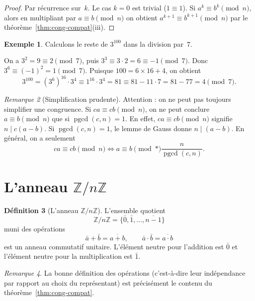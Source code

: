 \documentclass[12pt,a4paper,openany]{book}
\theoremstyle{definition}
\newtheorem{definition}{Définition}[chapter]
\newtheorem{exemple}[definition]{Exemple}
\theoremstyle{plain}
\theoremstyle{remark}
\newtheorem{remarque}[definition]{Remarque}
\newcommand{\Z}{\mathbb{Z}}
\DeclareMathOperator{\pgcd}{pgcd}
\begin{document}
\begin{proof}
Par récurrence sur~$k$. Le cas $k = 0$ est trivial ($1 \equiv 1$). Si
$a^k \equiv b^k \pmod{n}$, alors en multipliant par $a \equiv b \pmod{n}$
on obtient $a^{k+1} \equiv b^{k+1} \pmod{n}$ par le théorème~\ref{thm:cong-compat}(iii).
\end{proof}

\begin{exemple}
\label{ex:puissance-cong}
Calculons le reste de $3^{100}$ dans la division par~$7$.

On a $3^2 = 9 \equiv 2 \pmod{7}$, puis $3^3 \equiv 3 \cdot 2 = 6 \equiv -1 \pmod{7}$.
Donc $3^6 \equiv (-1)^2 = 1 \pmod{7}$.
Puisque $100 = 6 \times 16 + 4$, on obtient
\[
  3^{100} = (3^6)^{16} \cdot 3^4 \equiv 1^{16} \cdot 3^4 = 81 \equiv 81 - 11 \cdot 7 = 81 - 77 = 4 \pmod{7}.
\]
\end{exemple}

\begin{remarque}[Simplification prudente]
\label{rem:simplif-cong}
Attention : on ne peut pas toujours simplifier une congruence. Si $ca \equiv cb \pmod{n}$,
on ne peut conclure $a \equiv b \pmod{n}$ que si $\pgcd(c, n) = 1$. En effet,
$ca \equiv cb \pmod{n}$ signifie $n \mid c(a - b)$. Si $\pgcd(c, n) = 1$, le
lemme de Gauss donne $n \mid (a - b)$. En général, on a seulement
\[
  ca \equiv cb \pmod{n} \iff a \equiv b \pmod*{\frac{n}{\pgcd(c, n)}}.
\]
\end{remarque}

\section{L'anneau $\Z/n\Z$}
\label{sec:ZnZ}
\index{Z/nZ@$\Z/n\Z$}

\begin{definition}[L'anneau $\Z/n\Z$]
\label{def:ZnZ}
L'ensemble quotient
\[
  \Z/n\Z = \{ \bar{0}, \bar{1}, \ldots, \overline{n-1} \}
\]
muni des opérations
\[
  \bar{a} + \bar{b} = \overline{a + b}, \qquad
  \bar{a} \cdot \bar{b} = \overline{a \cdot b}
\]
est un anneau commutatif unitaire. L'élément neutre pour
l'addition est $\bar{0}$ et l'élément neutre pour la multiplication est $\bar{1}$.
\end{definition}

\begin{remarque}
La bonne définition des opérations (c'est-à-dire leur indépendance par rapport
au choix du représentant) est précisément le contenu du
théorème~\ref{thm:cong-compat}.
\end{remarque}
\end{document}
